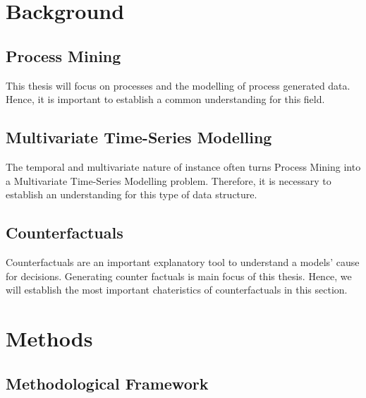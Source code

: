 \documentclass[12pt,a4paper]{report}
\begin{document}
\chapter{Background}
\label{ch:prereq}

\section{Process Mining}
\label{sec:process}
This thesis will focus on processes and the modelling of process generated data. Hence, it is important to establish a common understanding for this field.



\section{Multivariate Time-Series Modelling}
\label{sec:sequences}
The temporal and multivariate nature of \gls{instance} often turns Process Mining into a Multivariate Time-Series Modelling problem. Therefore, it is necessary to establish an understanding for this type of data structure.



\section{Counterfactuals}
\label{sec:counterfactuals}
Counterfactuals are an important explanatory tool to understand a models' cause for decisions. Generating counter factuals is main focus of this thesis. Hence, we will establish the most important chateristics of counterfactuals in this section.












\chapter{Methods}
\label{sec:methods}

\section{Methodological Framework}
\label{sec:framework}

\end{document}

